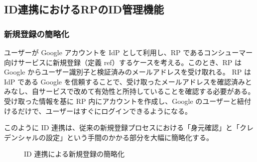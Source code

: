 \documentclass[uplatex]{jsarticle}
\def\ref#1{ref}%
\def\label#1{}%
\begin{document}
\subsection{ID連携におけるRPのID管理機能}\label{subsec:ch4-rp}

\subsubsection{新規登録の簡略化}

\begin{exa}\label{exa:ch4-google-signup}
ユーザーが Google アカウントを IdP として利用し、RP であるコンシューマー向けサービスに新規登録（定義 \ref{dfn:signup}）するケースを考える。このとき、RP は Google からユーザー識別子と検証済みのメールアドレスを受け取れる。
RP は IdP である Google を信頼することで、受け取ったメールアドレスを確認済みとみなし、自サービスで改めて有効性と所持していることを確認する必要がある。
受け取った情報を基に RP 内にアカウントを作成し、Google のユーザーと紐付けるだけで、ユーザーはすぐにログインできるようになる。
\end{exa}

このように ID 連携は、従来の新規登録プロセスにおける「身元確認」と「クレデンシャルの設定」という手間のかかる部分を大幅に簡略化する。

\begin{figure}[H]
\centering
{}
\caption{ID 連携による新規登録の簡略化}
\label{fig:ch4-federated-signup}
\end{figure}
\end{document}

